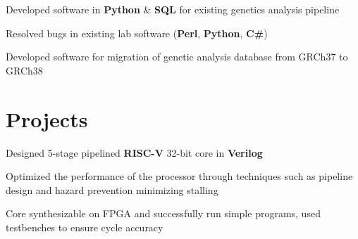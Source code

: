 \documentclass[]{chandan-cv}
\begin{document}
\begin{minipage}[t]{0.77\textwidth}

\begin{tightemize}
	\item Developed software in \textbf{Python} \& \textbf{SQL} for existing genetics analysis pipeline 
	\item Resolved bugs in existing lab software (\textbf{Perl}, \textbf{Python}, \textbf{C\#})
	\item Developed software for migration of genetic analysis database from GRCh37 to GRCh38
\end{tightemize}
\sectionsep



\section{Projects}

\descript{ }
\location{ }
\begin{tightemize}
	\item Designed 5-stage pipelined \textbf{RISC-V} 32-bit core in \textbf{Verilog}
	\item Optimized the performance of the processor through techniques such as pipeline design and hazard prevention minimizing stalling 
	\item Core synthesizable on FPGA and successfully run simple programs, used testbenches to ensure cycle accuracy 
\end{tightemize}
\sectionsep



\end{minipage}
\end{document}
